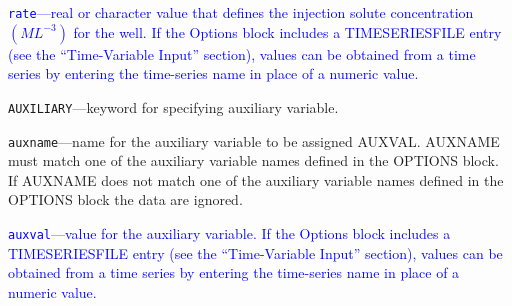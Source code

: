 \begin{description}
\item \textcolor{blue}{\texttt{rate}---real or character value that defines the injection solute concentration $(ML^{-3})$ for the well. If the Options block includes a TIMESERIESFILE entry (see the ``Time-Variable Input'' section), values can be obtained from a time series by entering the time-series name in place of a numeric value.}

\item \texttt{AUXILIARY}---keyword for specifying auxiliary variable.

\item \texttt{auxname}---name for the auxiliary variable to be assigned AUXVAL.  AUXNAME must match one of the auxiliary variable names defined in the OPTIONS block. If AUXNAME does not match one of the auxiliary variable names defined in the OPTIONS block the data are ignored.

\item \textcolor{blue}{\texttt{auxval}---value for the auxiliary variable. If the Options block includes a TIMESERIESFILE entry (see the ``Time-Variable Input'' section), values can be obtained from a time series by entering the time-series name in place of a numeric value.}

\end{description}

